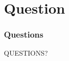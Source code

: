 \section{Question}
\begin{frame}[allowframebreaks]
\frametitle{Questions}

\Huge{QUESTIONS?}

\end{frame}
